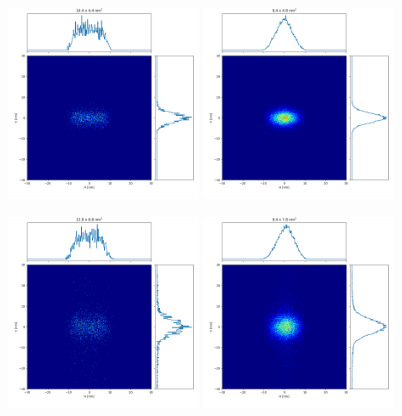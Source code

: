 \documentclass{iucr}              %
\begin{document}



\begin{figure}
\label{fig:ray tracing}
\centering
% 

\includegraphics[width=0.45\textwidth]{GRAPHICS/idealelementsESRF.png}
\includegraphics[width=0.45\textwidth]{GRAPHICS/idealelementsEBS.png}

\includegraphics[width=0.45\textwidth]{GRAPHICS/hybridnoerrorsESRF.png}
\includegraphics[width=0.45\textwidth]{GRAPHICS/hybridnoerrorsEBS.png}


\end{figure}
\end{document}
